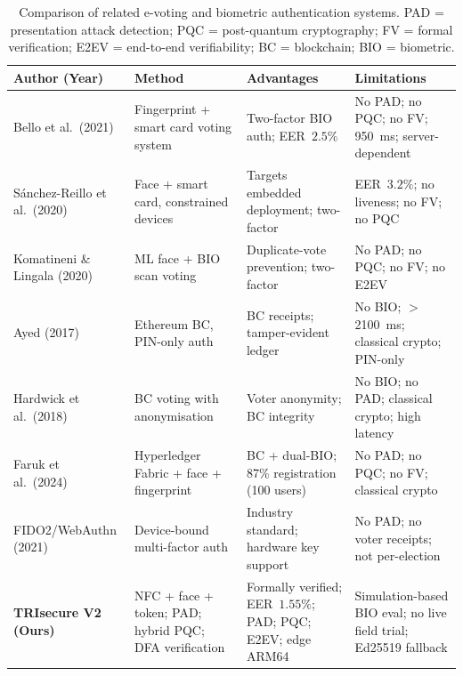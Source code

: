 \documentclass[preprint,12pt]{elsarticle}
\begin{document}
\begin{table}[t]
\centering
\caption{Comparison of related e-voting and biometric authentication systems.
  PAD = presentation attack detection; PQC = post-quantum cryptography;
  FV = formal verification; E2EV = end-to-end verifiability;
  BC = blockchain; BIO = biometric.}
\label{tab:related_comparison}
\footnotesize
\begin{tabular}{p{2.1cm}p{2.7cm}p{3.0cm}p{3.0cm}}
  \toprule
  \textbf{Author (Year)} & \textbf{Method} & \textbf{Advantages} & \textbf{Limitations} \\
  \midrule
  Bello et al.\ (2021)~\cite{bello2021biometric}
    & Fingerprint + smart card voting system
    & Two-factor BIO auth; EER~$2.5\%$
    & No PAD; no PQC; no FV; 950~ms; server-dependent \\
  \addlinespace
  Sánchez-Reillo et al.\ (2020)~\cite{sanchez2020biometric}
    & Face + smart card, constrained devices
    & Targets embedded deployment; two-factor
    & EER~$3.2\%$; no liveness; no FV; no PQC \\
  \addlinespace
  Komatineni \& Lingala (2020)~\cite{komatineni2020biometric}
    & ML face + BIO scan voting
    & Duplicate-vote prevention; two-factor
    & No PAD; no PQC; no FV; no E2EV \\
  \addlinespace
  Ayed (2017)~\cite{ayed2017conceptual}
    & Ethereum BC, PIN-only auth
    & BC receipts; tamper-evident ledger
    & No BIO; $>$2100~ms; classical crypto; PIN-only \\
  \addlinespace
  Hardwick et al.\ (2018)~\cite{hardwick2018voting}
    & BC voting with anonymisation
    & Voter anonymity; BC integrity
    & No BIO; no PAD; classical crypto; high latency \\
  \addlinespace
  Faruk et al.\ (2024)~\cite{faruk2024transforming}
    & Hyperledger Fabric + face + fingerprint
    & BC + dual-BIO; 87\% registration (100 users)
    & No PAD; no PQC; no FV; classical crypto \\
  \addlinespace
  FIDO2/WebAuthn (2021)~\cite{fido2_webauthn}
    & Device-bound multi-factor auth
    & Industry standard; hardware key support
    & No PAD; no voter receipts; not per-election \\
  \addlinespace
  \textbf{TRIsecure V2 (Ours)}
    & NFC + face + token; PAD; hybrid PQC; DFA verification
    & Formally verified; EER~$1.55\%$; PAD; PQC; E2EV; edge ARM64
    & Simulation-based BIO eval; no live field trial; Ed25519 fallback \\
  \bottomrule
\end{tabular}
\end{table}
\end{document}
